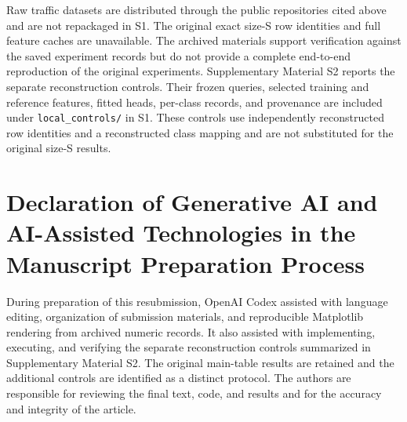 \documentclass[preprint,12pt,authoryear]{elsarticle}
\begin{document}
Raw traffic datasets are distributed through the public repositories cited above and are not repackaged in S1. The original exact size-S row identities and full feature caches are unavailable. The archived materials support verification against the saved experiment records but do not provide a complete end-to-end reproduction of the original experiments. Supplementary Material S2 reports the separate reconstruction controls. Their frozen queries, selected training and reference features, fitted heads, per-class records, and provenance are included under \texttt{local\_controls/} in S1. These controls use independently reconstructed row identities and a reconstructed class mapping and are not substituted for the original size-S results.

\section*{Declaration of Generative AI and AI-Assisted Technologies in the Manuscript Preparation Process}
During preparation of this resubmission, OpenAI Codex assisted with language editing, organization of submission materials, and reproducible Matplotlib rendering from archived numeric records. It also assisted with implementing, executing, and verifying the separate reconstruction controls summarized in Supplementary Material S2. The original main-table results are retained and the additional controls are identified as a distinct protocol. The authors are responsible for reviewing the final text, code, and results and for the accuracy and integrity of the article.



\end{document}
